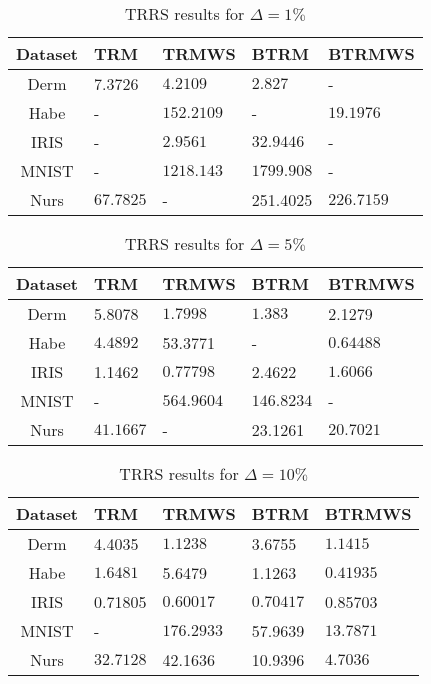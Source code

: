 \documentclass[letterpaper,12pt,titlepage,oneside,final]{book}
\begin{document}
\begin{table}[h] 
	\centering 
	\begin{tabular}{ |c||l|l||l|l|| } 
		\hline 
		\textbf{Dataset} & \textbf{TRM} & \textbf{TRMWS} & \textbf{BTRM} & \textbf{BTRMWS} \\ 
		\hline 
		\hline 
		Derm &7.3726 & $\mathbf{4.2109}$ & $\mathbf{2.827}$ & -\\ 
		\hline 
		Habe & - & $\mathbf{152.2109}$ & - & $\mathbf{19.1976}$\\ 
		\hline 
		IRIS & - & $\mathbf{2.9561}$ & $\mathbf{32.9446}$ & -\\ 
		\hline 
		MNIST & - & $\mathbf{1218.143}$ & $\mathbf{1799.908}$ & -\\ 
		\hline 
		Nurs & $\mathbf{67.7825}$ & - &251.4025 & $\mathbf{226.7159}$\\ 
		\hline 
	\end{tabular} 
	\caption{TRRS results for $\Delta = 1 \%$} \label{table:TRMWS1} \end{table}
\begin{table}[h] 
	\centering 
	\begin{tabular}{ |c||l|l||l|l|| } 
		\hline 
		\textbf{Dataset} & \textbf{TRM} & \textbf{TRMWS} & \textbf{BTRM} & \textbf{BTRMWS} \\ 
		\hline 
		\hline 
		Derm &5.8078 & $\mathbf{1.7998}$ & $\mathbf{1.383}$ &2.1279\\ 
		\hline 
		Habe & $\mathbf{4.4892}$ &53.3771 & - & $\mathbf{0.64488}$\\ 
		\hline 
		IRIS &1.1462 & $\mathbf{0.77798}$ &2.4622 & $\mathbf{1.6066}$\\ 
		\hline 
		MNIST & - & $\mathbf{564.9604}$ & $\mathbf{146.8234}$ & -\\ 
		\hline 
		Nurs & $\mathbf{41.1667}$ & - &23.1261 & $\mathbf{20.7021}$\\ 
		\hline 
	\end{tabular} 
	\caption{TRRS results for $\Delta = 5 \%$} \label{table:TRMWS5} \end{table}
	\begin{table}[h] 
		\centering 
		\begin{tabular}{ |c||l|l||l|l|| } 
			\hline 
			\textbf{Dataset} & \textbf{TRM} & \textbf{TRMWS} & \textbf{BTRM} & \textbf{BTRMWS} \\ 
			\hline 
			\hline 
			Derm &4.4035 & $\mathbf{1.1238}$ &3.6755 & $\mathbf{1.1415}$\\ 
			\hline 
			Habe & $\mathbf{1.6481}$ &5.6479 &1.1263 & $\mathbf{0.41935}$\\ 
			\hline 
			IRIS &0.71805 & $\mathbf{0.60017}$ & $\mathbf{0.70417}$ &0.85703\\ 
			\hline 
			MNIST & - & $\mathbf{176.2933}$ &57.9639 & $\mathbf{13.7871}$\\ 
			\hline 
			Nurs & $\mathbf{32.7128}$ &42.1636 &10.9396 & $\mathbf{4.7036}$\\ 
			\hline 
		\end{tabular} 
		\caption{TRRS results for $\Delta = 10 \%$} \label{table:TRMWS10} \end{table}
	
\end{document}
